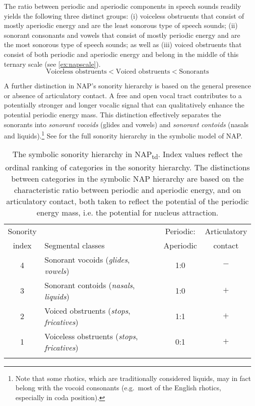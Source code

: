 The ratio between periodic and aperiodic components in speech sounds readily yields the following three distinct groups: (i) voiceless obstruents that consist of mostly aperiodic energy and are the least sonorous type of speech sounds; (ii) sonorant consonants and vowels that consist of mostly periodic energy and are the most sonorous type of speech sounds; as well as (iii) voiced obstruents that consist of both periodic and aperiodic energy and belong in the middle of this ternary scale (see \ref{ex:napscale}).
\begin{equation}
\text{Voiceless obstruents} < \text{Voiced obstruents} < \text{Sonorants} \label{ex:napscale}
\end{equation}

A further distinction in NAP's sonority hierarchy is based on the general presence or absence of articulatory contact.
A free and open vocal tract contributes to a potentially stronger and longer vocalic signal that can qualitatively enhance the potential periodic energy mass.
This distinction effectively separates the sonorants into \emph{sonorant vocoids} (glides and vowels) and \emph{sonorant contoids} (nasals and liquids).\footnote{Note that some rhotics, which are traditionally considered liquids, may in fact belong with the vocoid consonants (e.g.~most of the English rhotics, especially in coda position).} See  for the full sonority hierarchy in the symbolic model of NAP.


\begin{table}
\caption{\label{tab:napscale}The symbolic sonority hierarchy in NAP\textsubscript{td}. Index values reflect the ordinal ranking of categories in the sonority hierarchy. The distinctions between categories in the symbolic NAP hierarchy are based on the characteristic ratio between periodic and aperiodic energy, and on articulatory contact, both taken to reflect the potential of the periodic energy mass, i.e. the potential for nucleus attraction.}
\begin{tabular}{clcc}
\lsptoprule
Sonority &  & Periodic: & Articulatory\\
index & Segmental classes & Aperiodic & contact\\\midrule
4 & Sonorant vocoids (\emph{glides}, \emph{vowels}) & \multicolumn{1}{c}{1:0} & $-$\\
3 & Sonorant contoids (\emph{nasals}, \emph{liquids}) & \multicolumn{1}{c}{1:0} & $+$\\
2 & Voiced obstruents (\emph{stops}, \emph{fricatives})& \multicolumn{1}{c}{1:1} & $+$\\
1 & Voiceless obstruents (\emph{stops}, \emph{fricatives})  & \multicolumn{1}{c}{0:1} & $+$\\
\lspbottomrule
\end{tabular}
\end{table}

